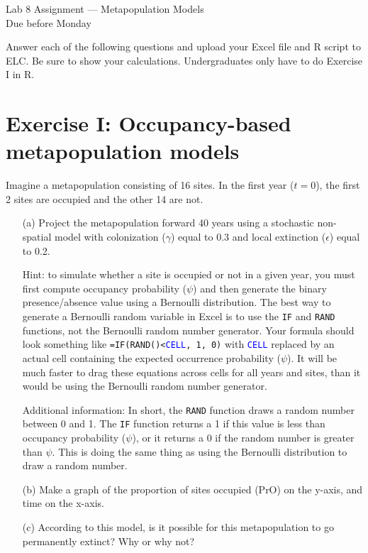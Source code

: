 \documentclass[12pt]{article}\usepackage[]{graphicx}\usepackage[]{color}
\begin{document}
{
  \Large
  \centering
  Lab 8 Assignment --- Metapopulation Models \\
  Due before Monday \\
}

\vspace{6pt}

Answer each of the following questions and upload your Excel file and
R script to ELC. Be sure to show your calculations. Undergraduates
only have to do Exercise I in R. \\

\vspace{6pt}

\section*{Exercise I: Occupancy-based metapopulation models}


Imagine a metapopulation consisting of 16 sites. In the first year
($t=0$), the first 2 sites are occupied and the other 14 are not.
\begin{enumerate}
  \item[(a)] Project the metapopulation forward 40 years using a
    stochastic non-spatial model with colonization ($\gamma$) equal to
    0.3 and local extinction ($\epsilon$) equal to 0.2.

    Hint: to simulate whether a site is occupied or not in a given year,
    you must first compute occupancy probability ($\psi$) and then generate
    the binary presence/absence value using a Bernoulli distribution. The
    best way to generate a Bernoulli random variable in Excel is to use
    the \texttt{IF} and \texttt{RAND} functions, not the Bernoulli
    random number generator. Your formula should look something like
    \texttt{=IF(RAND()<\textcolor{blue}{CELL}, 1, 0)} with \texttt{\textcolor{blue}{CELL}} replaced by an
    actual cell containing the expected occurrence probability
    ($\psi$). It will be much faster to drag these equations across
    cells for all years and sites, than it would be using the
    Bernoulli random number generator.

    Additional information: In short, the \texttt{RAND} function draws a
    random number between 0 and 1. The \texttt{IF} function returns a 1 if
    this value is less than occupancy probability ($\psi$), or it returns
    a 0 if the random number is greater than $\psi$. This is doing the
    same thing as using the Bernoulli distribution to draw a random
    number.
  \item[(b)] Make a graph of the proportion of sites occupied (PrO)
    on the y-axis, and time on the x-axis.
  \item[(c)] According to this model, is it possible for this
    metapopulation to go permanently extinct? Why or why not?
\end{enumerate}
\end{document}
